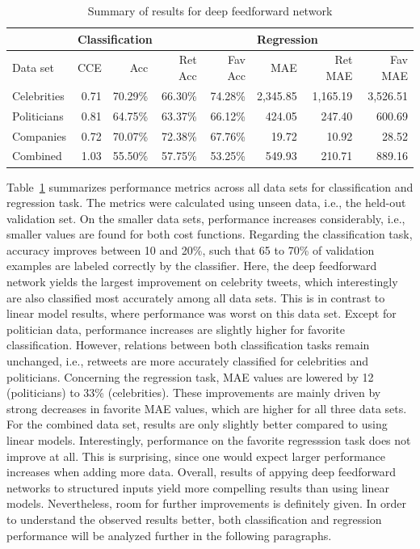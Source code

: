 \begin{table}
  \begin{tabular}{lrrrrrrr}
    \toprule
    & \multicolumn{4}{l}{Classification} & \multicolumn{3}{l}{Regression} \\
    \midrule
    Data set & CCE & Acc & Ret Acc & Fav Acc & MAE & Ret MAE & Fav MAE \\
    \midrule
    Celebrities & 0.71 & 70.29\% & 66.30\% & 74.28\% & 2,345.85 & 1,165.19 & 3,526.51 \\
    Politicians & 0.81 & 64.75\% & 63.37\% & 66.12\% & 424.05 & 247.40 & 600.69 \\
    Companies & 0.72 & 70.07\% & 72.38\% & 67.76\% & 19.72 & 10.92 & 28.52 \\
    Combined & 1.03 & 55.50\% & 57.75\% & 53.25\% & 549.93 & 210.71 & 889.16 \\
    \bottomrule
  \end{tabular}
  \caption{Summary of results for deep feedforward network}
  \label{tab:deep1_results}
\end{table}

Table~\ref{tab:deep1_results} summarizes performance metrics across all data
sets for classification and regression task.
The metrics were calculated using unseen data, i.e., the held-out validation
set.
On the smaller data sets, performance increases considerably, i.e.,
smaller values are found for both cost functions.
Regarding the classification task, accuracy improves between 10 and 20\%, such
that 65 to 70\% of validation examples are labeled correctly by the classifier.
Here, the deep feedforward network yields the largest improvement on celebrity
tweets, which interestingly are also classified most accurately among all data sets.
This is in contrast to linear model results, where performance was worst on this
data set.
Except for politician data, performance increases are slightly higher for favorite
classification.
However, relations between both classification tasks remain unchanged, i.e.,
retweets are more accurately classified for celebrities and politicians.
Concerning the regression task, MAE values are lowered by 12 (politicians) to
33\% (celebrities).
These improvements are mainly driven by strong decreases in favorite MAE values,
which are higher for all three data sets.
For the combined data set, results are only slightly better compared to using
linear models.
Interestingly, performance on the favorite regresssion task does not improve
at all.
This is surprising, since one would expect larger performance increases when
adding more data.
Overall, results of appying deep feedforward networks to structured inputs
yield more compelling results than using linear models.
Nevertheless, room for further improvements is definitely given.
In order to understand the observed results better, both classification and 
regression performance will be analyzed further in the following paragraphs.

